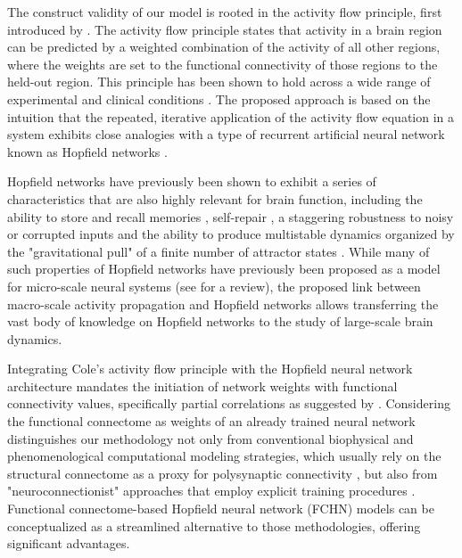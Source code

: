 \documentclass{article}
\begin{document}
The construct validity of our model is rooted in the activity flow principle, first introduced by
\citet{cole2016activity}. The activity flow principle states that activity in a brain region can be predicted by a weighted combination of the activity of all other regions, where the weights are set to the functional connectivity of those regions to the held-out region. This principle has been shown to hold across a wide range of experimental and clinical conditions
\citep{cole2016activity, ito2017cognitive, mill2022network, hearne2021activity, chen2018human}.
The proposed approach is based on the intuition that the repeated, iterative application of the activity flow equation in a system exhibits close analogies with a type of recurrent artificial neural network known as Hopfield networks \citep{hopfield1982neural}.

Hopfield networks have previously been shown to exhibit a series of characteristics that are also highly relevant for
brain function, including the ability to store and recall memories \citep{hopfield1982neural}, self-repair \citep{murre2003selfreparing},
a staggering robustness to noisy or corrupted inputs \citep{hertz1991introduction} and the ability to produce
multistable dynamics organized by the "gravitational pull" of a finite number of attractor states
\citep{khona2022attractor}. While many of such properties of Hopfield networks have previously been proposed as a model for micro-scale neural systems (see \cite{khona2022attractor} for a review), the proposed link between macro-scale activity propagation and Hopfield networks allows transferring the vast body of knowledge on Hopfield networks to the study of large-scale brain dynamics.

Integrating Cole's activity flow principle with the Hopfield neural network architecture mandates the initiation of network weights with functional connectivity values, specifically partial correlations as suggested by \citet{cole2016activity}.
Considering the functional connectome as weights of an already trained neural network distinguishes our methodology not only from conventional biophysical and phenomenological computational modeling strategies, which usually rely on the structural connectome as a proxy for polysynaptic connectivity \citep{cabral2017functional}, but also from "neuroconnectionist" approaches that employ explicit training procedures \citep{doerig2023neuroconnectionist}.
Functional connectome-based Hopfield neural network (FCHN) models can be conceptualized as a streamlined alternative to those methodologies, offering significant advantages.
\end{document}
